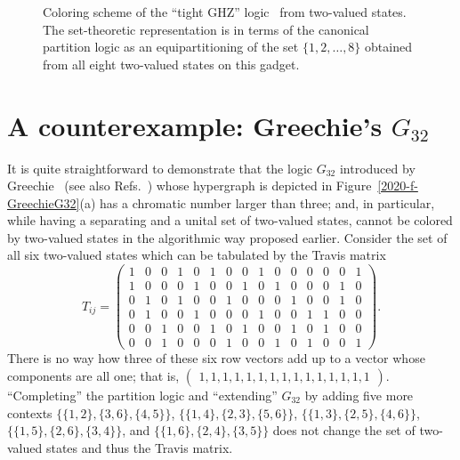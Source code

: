 \documentclass[%
12pt,
prereprint,
showpacs,
showkeys,
preprintnumbers,
amsmath,amssymb,
aps,
pra,
longbibliography,
notitlepage
]{revtex4-1}
\theoremstyle{definition}
\begin{document}
\begin{figure}
\begin{center}
\begin{tikzpicture}  [scale=0.7]
                        \end{tikzpicture}
                \end{center}
                \caption{\label{2020-f-GHZ}
                        Coloring scheme of the ``tight GHZ'' logic~\cite{svozil-2020-ghz} from two-valued states.
                        The set-theoretic representation is in terms of
                        the canonical partition logic as an equipartitioning of the set $\{1,2,\ldots,8\}$
                        obtained from all eight two-valued states on this gadget.
                }
        \end{figure}

        \section{A counterexample: Greechie's $G_{32}$}\label{2021-chroma-G32}

        It is quite straightforward to demonstrate that the logic $G_{32}$ introduced by Greechie~\cite[Figure~6, p.~121]{greechie:71}
        (see also Refs.~\cite{Holland1975,Bennett-MC-1970,Greechie1974,Greechie-Suppes1976})
        whose hypergraph is depicted in Figure~\ref{2020-f-GreechieG32}(a) has a chromatic number larger than three;
        and, in particular, while having a separating and a unital set of two-valued states, cannot be colored by two-valued states in the algorithmic way proposed earlier.
        Consider the set of all six two-valued states which can be tabulated by the Travis matrix
        \begin{equation}
                T_{ij}=\begin{pmatrix}
                        1&0&0&1&0&1&0&0&1&0&0&0&0&0&1\\
                        1&0&0&0&1&0&0&1&0&1&0&0&0&1&0\\
                        0&1&0&1&0&0&1&0&0&0&1&0&0&1&0\\
                        0&1&0&0&1&0&0&0&1&0&0&1&1&0&0\\
                        0&0&1&0&0&1&0&1&0&0&1&0&1&0&0\\
                        0&0&1&0&0&0&1&0&0&1&0&1&0&0&1
                \end{pmatrix}
                .
        \end{equation}
        There is no way how three of these six row vectors add up to
        a vector whose components are all one; that is,
        $
        \begin{pmatrix}
                1,1,1,1,1,1,1,1,1,1,1,1,1,1,1
        \end{pmatrix}
        $.
        ``Completing'' the partition logic and ``extending''
        $G_{32}$ by adding five more contexts
        $\{\{1, 2\}, \{3, 6\}, \{4, 5\}\}$,
        $\{\{1, 4\}, \{2, 3\}, \{5, 6\}\}$,
        $\{\{1, 3\}, \{2, 5\}, \{4, 6\}\}$,
        $\{\{1, 5\}, \{2, 6\}, \{3, 4\}\}$, and
        $\{\{1, 6\}, \{2, 4\}, \{3, 5\}\}$
        does not change the set of two-valued states and thus the Travis matrix.
\end{document}
